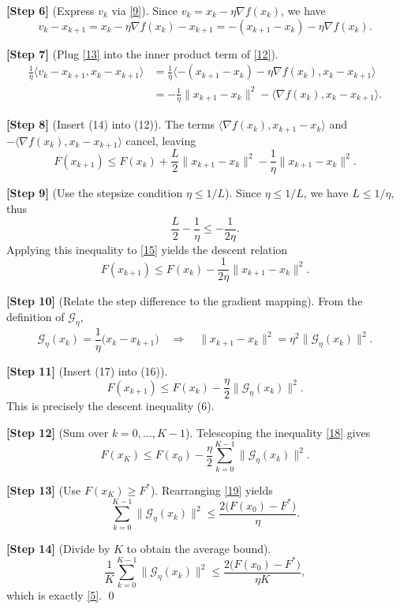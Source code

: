 \documentclass{article}
\newcommand{\grad}{\nabla}
\begin{document}
\noindent\textbf{[Step 6]} (Express $v_{k}$ via \eqref{9}).  
Since $v_{k}=x_{k}-\eta\grad f(x_{k})$, we have
\[
v_{k}-x_{k+1}=x_{k}-\eta\grad f(x_{k})-x_{k+1}
=-(x_{k+1}-x_{k})-\eta\grad f(x_{k}). \tag{13}
\]

\noindent\textbf{[Step 7]} (Plug \eqref{13} into the inner product term of \eqref{12}).  
\[
\begin{aligned}
\frac{1}{\eta}\langle v_{k}-x_{k+1},x_{k}-x_{k+1}\rangle
&=\frac{1}{\eta}\langle -(x_{k+1}-x_{k})-\eta\grad f(x_{k}),x_{k}-x_{k+1}\rangle\\
&=-\frac{1}{\eta}\|x_{k+1}-x_{k}\|^{2}
-\langle\grad f(x_{k}),x_{k}-x_{k+1}\rangle. \tag{14}
\end{aligned}
\]

\noindent\textbf{[Step 8]} (Insert (14) into (12)).  
The terms $\langle\grad f(x_{k}),x_{k+1}-x_{k}\rangle$ and $-\langle\grad f(x_{k}),x_{k}-x_{k+1}\rangle$ cancel, leaving
\[
F(x_{k+1})\le F(x_{k})+\frac{L}{2}\|x_{k+1}-x_{k}\|^{2}
-\frac{1}{\eta}\|x_{k+1}-x_{k}\|^{2}. \tag{15}
\]

\noindent\textbf{[Step 9]} (Use the stepsize condition $\eta\le 1/L$).  
Since $\eta\le 1/L$, we have $L\le 1/\eta$, thus
\[
\frac{L}{2}-\frac{1}{\eta}\le -\frac{1}{2\eta}.
\]
Applying this inequality to \eqref{15} yields the descent relation
\[
F(x_{k+1})\le F(x_{k})-\frac{1}{2\eta}\|x_{k+1}-x_{k}\|^{2}. \tag{16}
\]

\noindent\textbf{[Step 10]} (Relate the step difference to the gradient mapping).  
From the definition of $\mathcal{G}_{\eta}$,
\[
\mathcal{G}_{\eta}(x_{k})=\frac{1}{\eta}\big(x_{k}-x_{k+1}\big)
\quad\Longrightarrow\quad
\|x_{k+1}-x_{k}\|^{2}= \eta^{2}\|\mathcal{G}_{\eta}(x_{k})\|^{2}. \tag{17}
\]

\noindent\textbf{[Step 11]} (Insert (17) into (16)).  
\[
F(x_{k+1})\le F(x_{k})-\frac{\eta}{2}\|\mathcal{G}_{\eta}(x_{k})\|^{2}. \tag{18}
\]
This is precisely the descent inequality (6).

\noindent\textbf{[Step 12]} (Sum over $k=0,\dots,K-1$).  
Telescoping the inequality \eqref{18} gives
\[
F(x_{K})\le F(x_{0})-\frac{\eta}{2}\sum_{k=0}^{K-1}\|\mathcal{G}_{\eta}(x_{k})\|^{2}. \tag{19}
\]

\noindent\textbf{[Step 13]} (Use $F(x_{K})\ge F^{*}$).  
Rearranging \eqref{19} yields
\[
\sum_{k=0}^{K-1}\|\mathcal{G}_{\eta}(x_{k})\|^{2}
\le \frac{2\big(F(x_{0})-F^{*}\big)}{\eta}. \tag{20}
\]

\noindent\textbf{[Step 14]} (Divide by $K$ to obtain the average bound).  
\[
\frac{1}{K}\sum_{k=0}^{K-1}\|\mathcal{G}_{\eta}(x_{k})\|^{2}
\le\frac{2\big(F(x_{0})-F^{*}\big)}{\eta K}, 
\]
which is exactly \eqref{5}. \qed
\end{document}
